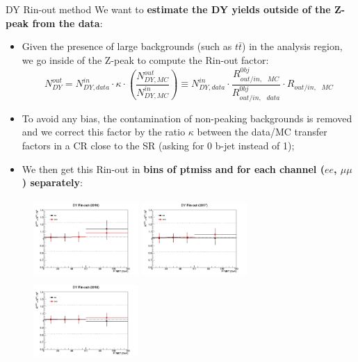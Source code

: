 \documentclass[8pt]{beamer}
\begin{document}
\begin{frame}{DY Rin-out method}
\justifying
We want to \textbf{estimate the DY yields outside of the Z-peak from the data}:

\begin{itemize}
\justifying
\item Given the presence of large backgrounds (such as $t \bar t$) in the analysis region, we go inside of the Z-peak to compute the \alert{Rin-out factor}:
\begin{equation*}
N^{out}_{DY} = N^{in}_{DY, data} \cdot \kappa \cdot \left (\frac{N^{out}_{DY, MC}}{N^{in}_{DY, MC}} \right ) \equiv N^{in}_{DY, data} \cdot \frac{R_{out/in,\text{ } MC}^{0bj}}{R_{out/in,\text{ } data}^{0bj}} \cdot R_{out/in,\text{ } MC}
\end{equation*}
\item To avoid any bias, the contamination of non-peaking backgrounds is removed and we correct this factor by the ratio $\kappa$ between the data/MC transfer factors in a CR close to the SR (asking for 0 b-jet instead of 1);
\item We then get this Rin-out in \textbf{bins of ptmiss and for each channel ($ee$, $\mu \mu$) separately}:
\end{itemize}

\begin{figure}[htbp]
\begin{center}
\begin{minipage}[b]{.32\textwidth}
\includegraphics[width=4cm, height=3cm]{figs/Rinout2016_data.png}
\end{minipage} \hfill
\begin{minipage}[b]{.32\textwidth}
\includegraphics[width=4cm, height=3cm]{figs/Rinout2017_data.png}
\end{minipage} \hfill
\begin{minipage}[b]{.32\textwidth}
\includegraphics[width=4cm, height=3cm]{figs/Rinout2018_data.png}
\end{minipage} \hfill
\end{center}
\end{figure} \vfill


\end{frame}
\end{document}
